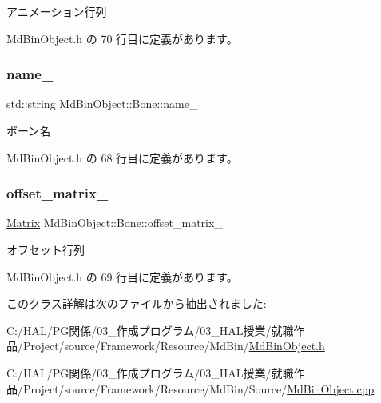 アニメーション行列 



 Md\+Bin\+Object.\+h の 70 行目に定義があります。

\mbox{\label{class_md_bin_object_1_1_bone_ae9a47dcfa4c7f15e95b76a31846c9481}} 
\subsubsection{\texorpdfstring{name\+\_\+}{name\_}}
{\footnotesize\ttfamily std\+::string Md\+Bin\+Object\+::\+Bone\+::name\+\_\+\hspace{0.3cm}{\ttfamily [private]}}



ボーン名 



 Md\+Bin\+Object.\+h の 68 行目に定義があります。

\mbox{\label{class_md_bin_object_1_1_bone_a7ec2fdffbe14211b099c580c492f808a}} 
\subsubsection{\texorpdfstring{offset\+\_\+matrix\+\_\+}{offset\_matrix\_}}
{\footnotesize\ttfamily \mbox{\hyperlink{class_matrix}{Matrix}} Md\+Bin\+Object\+::\+Bone\+::offset\+\_\+matrix\+\_\+\hspace{0.3cm}{\ttfamily [private]}}



オフセット行列 



 Md\+Bin\+Object.\+h の 69 行目に定義があります。



このクラス詳解は次のファイルから抽出されました\+:\begin{DoxyCompactItemize}
\item 
C\+:/\+H\+A\+L/\+P\+G関係/03\+\_\+作成プログラム/03\+\_\+\+H\+A\+L授業/就職作品/\+Project/source/\+Framework/\+Resource/\+Md\+Bin/\mbox{\hyperlink{_md_bin_object_8h}{Md\+Bin\+Object.\+h}}\item 
C\+:/\+H\+A\+L/\+P\+G関係/03\+\_\+作成プログラム/03\+\_\+\+H\+A\+L授業/就職作品/\+Project/source/\+Framework/\+Resource/\+Md\+Bin/\+Source/\mbox{\hyperlink{_md_bin_object_8cpp}{Md\+Bin\+Object.\+cpp}}\end{DoxyCompactItemize}
